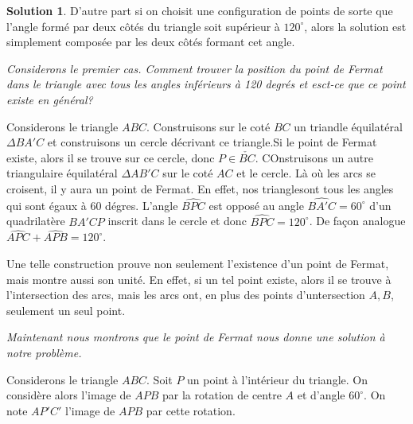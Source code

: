 \documentclass[10pt,a4paper]{article}%
\theoremstyle{theorem}
\theoremstyle{definition}
\newtheorem*{solution*}{Solution}
\begin{document}
\begin{solution*}
			D’autre part si on choisit une configuration de points de sorte que l’angle formé par deux côtés du triangle soit supérieur à $120^\circ$, alors la solution est simplement composée par les deux côtés formant cet angle.
			
			\begin{center}
			\end{center}
			
			\textit{Considerons le premier cas. Comment trouver la position du point de Fermat dans le triangle avec tous les angles inférieurs à 120 degrés et esct-ce que ce point existe en général?}
			
			Considerons le triangle $ABC$. Construisons sur le coté $BC$ un triandle équilatéral $\Delta BA'C$ et construisons un cercle décrivant ce triangle.Si le point de Fermat existe, alors il se trouve sur ce cercle, donc $P\in \check{BC}$. COnstruisons un autre triangulaire équilatéral $\Delta AB'C$ sur le coté $AC$ et le cercle. Là où les arcs se croisent, il y aura un point de Fermat. En effet, nos trianglesont tous les angles qui sont égaux à 60  dégres. L'angle $\widehat{BPC}$ est opposé au angle $\widehat{BA'C}=60^\circ$ d'un quadrilatère $BA'CP$ inscrit dans le cercle et donc $\widehat{BPC}=120^\circ$. De façon analogue $\widehat{APC}+\widehat{APB}=120^\circ$.
			
			Une telle construction prouve non seulement l'existence d'un point de Fermat, mais montre aussi son unité. En effet, si un tel point existe, alors il se trouve à l'intersection des arcs, mais les arcs ont, en plus des points d'untersection $A,B$, seulement un seul point.
			
			
			\textit{Maintenant nous montrons que le point de Fermat nous donne une solution à notre problème.}
			
			Considerons le triangle $ABC$. Soit $P$ un point à l'intérieur du triangle. On considère alors l'image de $APB$ par la rotation de centre $A$ et d'angle $60^\circ$. On note $AP'C'$ l'image de $APB$ par cette rotation.	
		
		 

\end{solution*}
\end{document}
